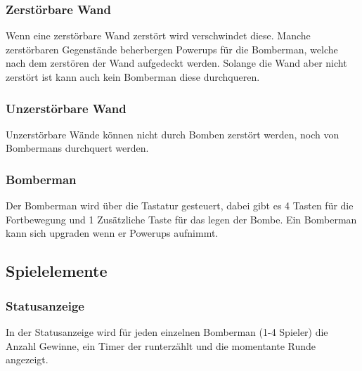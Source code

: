 \documentclass[11pt]{scrartcl}
\begin{document}
\subsubsection{Zerstörbare Wand}
\label{sec:Zerstörbare Wand}
Wenn eine zerstörbare Wand zerstört wird verschwindet diese.
Manche zerstörbaren Gegenstände beherbergen Powerups für die Bomberman, welche nach dem zerstören der Wand aufgedeckt werden.
Solange die Wand aber nicht zerstört ist kann auch kein Bomberman diese durchqueren.

\subsubsection{Unzerstörbare Wand}
\label{sec:Unzerstörbare Wand}
Unzerstörbare Wände können nicht durch Bomben zerstört werden, noch von Bombermans durchquert werden.

\subsubsection{Bomberman}
\label{sec:Bomberman}
Der Bomberman wird über die Tastatur gesteuert, dabei gibt es 4 Tasten für die Fortbewegung und 1 Zusätzliche Taste für das legen der Bombe.
Ein Bomberman kann sich \grqq{}upgraden\grqq{} wenn er Powerups aufnimmt.

\subsection{Spielelemente}
\label{sec:Spielelemente}
\subsubsection{Statusanzeige}
\label{sec:Statusanzeige}
In der Statusanzeige wird für jeden einzelnen Bomberman (1-4 Spieler) die Anzahl 
Gewinne, ein Timer der runterzählt und die momentante Runde angezeigt.
\end{document}
